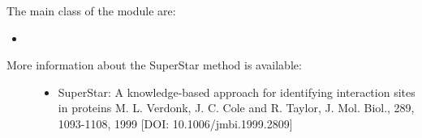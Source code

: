 \documentclass[letterpaper,10pt,english]{sphinxmanual}
\begin{document}
The main class of the {\hyperref[\detokenize{atomic_hotspot_calculation_api:module-hotspots.atomic_hotspot_calculation}]{}} module are:
\begin{itemize}
\item {} 
{\hyperref[\detokenize{atomic_hotspot_calculation_api:hotspots.atomic_hotspot_calculation.AtomicHotspot}]{}}

\end{itemize}
\begin{description}
\item[{More information about the SuperStar method is available:}] \leavevmode\begin{itemize}
\item {} 
SuperStar: A knowledge-based approach for identifying interaction sites in proteins M. L. Verdonk, J. C. Cole and R. Taylor, J. Mol. Biol., 289, 1093-1108, 1999 {[}DOI: 10.1006/jmbi.1999.2809{]}

\end{itemize}

\end{description}
\end{document}
